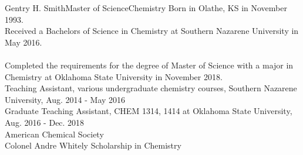 \newpage
\begin{vita}{Gentry H. Smith}{Master of Science}{Chemistry} %
     Born in Olathe, KS in November 1993. 
     \\ Received a Bachelors of Science in Chemistry at Southern Nazarene University in May 2016. \\ \\
Completed the requirements for the degree of Master of Science with a major in Chemistry at Oklahoma State University in November 2018.
     \\ Teaching Assistant, various undergraduate chemistry courses, Southern Nazarene University, Aug. 2014 - May 2016 \\ Graduate Teaching Assistant, CHEM 1314, 1414 at Oklahoma State University, Aug. 2016 - Dec. 2018
     \\ American Chemical Society
    \\ Colonel Andre Whitely Scholarship in Chemistry
\end{vita}
